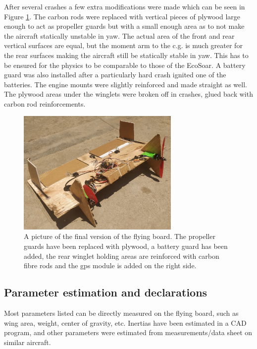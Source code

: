 \documentclass{article}
\begin{document}
After several crashes a few extra modifications were made which can be seen in Figure \ref{fig:finalboard}.
The carbon rods were replaced with vertical pieces of plywood large enough to act as propeller guards but with a small enough area as to not make the aircraft statically unstable in yaw.
The actual area of the front and rear vertical surfaces are equal, but the moment arm to the c.g. is much greater for the rear surfaces making the aircraft still be statically stable in yaw.
This has to be ensured for the physics to be comparable to those of the EcoSoar.
A battery guard was also installed after a particularly hard crash ignited one of the batteries.
The engine mounts were slightly reinforced and made straight as well.
The plywood areas under the winglets were broken off in crashes, glued back with carbon rod reinforcements.

\begin{figure}
    \center
    \includegraphics[width=0.7\textwidth]{plywoodfinal.jpg}
    \caption{A picture of the final version of the flying board. The propeller guards have been replaced with plywood, a battery guard has been added, the rear winglet holding areas are reinforced with carbon fibre rods and the gps module is added on the right side.}
    \label{fig:finalboard}
\end{figure}


\subsection{Parameter estimation and declarations}
Most parameters listed can be directly measured on the flying board, such as wing area, weight, center of gravity, etc.
Inertias have been estimated in a CAD program, and other parameters were estimated from measurements/data sheet on similar aircraft.
\end{document}
